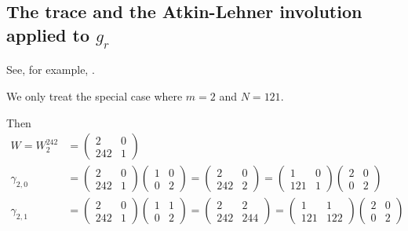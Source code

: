 \documentclass{article}
\begin{document}
\begin{Hemmecke}




 \subsection{The trace and the Atkin-Lehner involution applied to
   $g_r$}

See, for example, \cite{Kohnen_WeierstrassPointsAtInfinity_2004}.

We only treat the special case where $m=2$ and $N=121$.

Then
\begin{align*}
  W = W_2^{242}
  &=
    \begin{pmatrix}
      2 & 0\\
      242 & 1
    \end{pmatrix}\\
  \gamma_{2,0}
  &=
    \begin{pmatrix}
      2 & 0\\
      242 & 1
    \end{pmatrix}
    \begin{pmatrix}
      1 & 0\\
      0 & 2
    \end{pmatrix}
  =
    \begin{pmatrix}2&0\\242&2\end{pmatrix}
  =
    \begin{pmatrix}1&0\\121&1\end{pmatrix}
    \begin{pmatrix}2&0\\0&2\end{pmatrix}
  \\
  \gamma_{2,1}
  &=
    \begin{pmatrix}
      2 & 0\\
      242 & 1
    \end{pmatrix}
    \begin{pmatrix}
      1 & 1\\
      0 & 2
    \end{pmatrix}
  =
    \begin{pmatrix}2&2\\242&244\end{pmatrix}
  =
    \begin{pmatrix}1&1\\121&122\end{pmatrix}
    \begin{pmatrix}2&0\\0&2\end{pmatrix}
\end{align*}


\end{Hemmecke}
\end{document}
